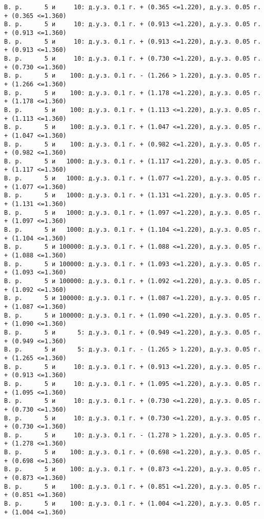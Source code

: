 \documentclass[11pt]{article}
\begin{document}
{\begin{Verbatim}[commandchars=\\\{\}]
В. р.      5 и     10: д.у.з. 0.1 г. + (0.365 <=1.220), д.у.з. 0.05 г. + (0.365 <=1.360)
В. р.      5 и     10: д.у.з. 0.1 г. + (0.913 <=1.220), д.у.з. 0.05 г. + (0.913 <=1.360)
В. р.      5 и     10: д.у.з. 0.1 г. + (0.913 <=1.220), д.у.з. 0.05 г. + (0.913 <=1.360)
В. р.      5 и     10: д.у.з. 0.1 г. + (0.730 <=1.220), д.у.з. 0.05 г. + (0.730 <=1.360)
В. р.      5 и    100: д.у.з. 0.1 г. - (1.266 > 1.220), д.у.з. 0.05 г. + (1.266 <=1.360)
В. р.      5 и    100: д.у.з. 0.1 г. + (1.178 <=1.220), д.у.з. 0.05 г. + (1.178 <=1.360)
В. р.      5 и    100: д.у.з. 0.1 г. + (1.113 <=1.220), д.у.з. 0.05 г. + (1.113 <=1.360)
В. р.      5 и    100: д.у.з. 0.1 г. + (1.047 <=1.220), д.у.з. 0.05 г. + (1.047 <=1.360)
В. р.      5 и    100: д.у.з. 0.1 г. + (0.982 <=1.220), д.у.з. 0.05 г. + (0.982 <=1.360)
В. р.      5 и   1000: д.у.з. 0.1 г. + (1.117 <=1.220), д.у.з. 0.05 г. + (1.117 <=1.360)
В. р.      5 и   1000: д.у.з. 0.1 г. + (1.077 <=1.220), д.у.з. 0.05 г. + (1.077 <=1.360)
В. р.      5 и   1000: д.у.з. 0.1 г. + (1.131 <=1.220), д.у.з. 0.05 г. + (1.131 <=1.360)
В. р.      5 и   1000: д.у.з. 0.1 г. + (1.097 <=1.220), д.у.з. 0.05 г. + (1.097 <=1.360)
В. р.      5 и   1000: д.у.з. 0.1 г. + (1.104 <=1.220), д.у.з. 0.05 г. + (1.104 <=1.360)
В. р.      5 и 100000: д.у.з. 0.1 г. + (1.088 <=1.220), д.у.з. 0.05 г. + (1.088 <=1.360)
В. р.      5 и 100000: д.у.з. 0.1 г. + (1.093 <=1.220), д.у.з. 0.05 г. + (1.093 <=1.360)
В. р.      5 и 100000: д.у.з. 0.1 г. + (1.092 <=1.220), д.у.з. 0.05 г. + (1.092 <=1.360)
В. р.      5 и 100000: д.у.з. 0.1 г. + (1.087 <=1.220), д.у.з. 0.05 г. + (1.087 <=1.360)
В. р.      5 и 100000: д.у.з. 0.1 г. + (1.090 <=1.220), д.у.з. 0.05 г. + (1.090 <=1.360)
В. р.      5 и      5: д.у.з. 0.1 г. + (0.949 <=1.220), д.у.з. 0.05 г. + (0.949 <=1.360)
В. р.      5 и      5: д.у.з. 0.1 г. - (1.265 > 1.220), д.у.з. 0.05 г. + (1.265 <=1.360)
В. р.      5 и     10: д.у.з. 0.1 г. + (0.913 <=1.220), д.у.з. 0.05 г. + (0.913 <=1.360)
В. р.      5 и     10: д.у.з. 0.1 г. + (1.095 <=1.220), д.у.з. 0.05 г. + (1.095 <=1.360)
В. р.      5 и     10: д.у.з. 0.1 г. + (0.730 <=1.220), д.у.з. 0.05 г. + (0.730 <=1.360)
В. р.      5 и     10: д.у.з. 0.1 г. + (0.730 <=1.220), д.у.з. 0.05 г. + (0.730 <=1.360)
В. р.      5 и     10: д.у.з. 0.1 г. - (1.278 > 1.220), д.у.з. 0.05 г. + (1.278 <=1.360)
В. р.      5 и    100: д.у.з. 0.1 г. + (0.698 <=1.220), д.у.з. 0.05 г. + (0.698 <=1.360)
В. р.      5 и    100: д.у.з. 0.1 г. + (0.873 <=1.220), д.у.з. 0.05 г. + (0.873 <=1.360)
В. р.      5 и    100: д.у.з. 0.1 г. + (0.851 <=1.220), д.у.з. 0.05 г. + (0.851 <=1.360)
В. р.      5 и    100: д.у.з. 0.1 г. + (1.004 <=1.220), д.у.з. 0.05 г. + (1.004 <=1.360)

\end{Verbatim}}
\end{document}

